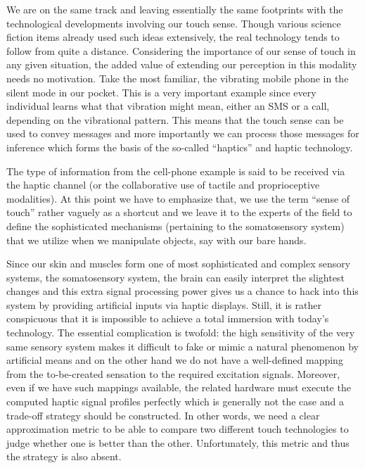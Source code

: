 We are on the same track and leaving essentially the same footprints with the technological developments involving our touch sense. Though various science fiction items already used such ideas extensively, the real technology tends to follow from quite a distance.  Considering the importance of our sense of touch in any given situation, the added value of extending our perception in this modality needs no motivation. Take the most familiar, the vibrating mobile phone in the silent mode in our pocket. This is a very important example since every individual learns what that vibration might mean, either an SMS or a call, depending on the vibrational pattern. This means that the touch sense can be used to convey messages and more importantly we can process those messages for inference which forms the basis of the so-called \enquote{haptics} and haptic technology.


The type of information from the cell-phone example is said to be received via the haptic channel (or the collaborative use of tactile and proprioceptive modalities). At this point we have to emphasize that, we use the term \enquote{sense of touch} rather vaguely as a shortcut and we leave it to the experts of the field to define the sophisticated mechanisms (pertaining to the somatosensory system) that we utilize when we manipulate objects, say with our bare hands. 


Since our skin and muscles form one of most sophisticated and complex sensory systems, the somatosensory system, the brain can easily interpret the slightest changes and this extra signal processing power gives us a chance to hack into this system by providing artificial inputs via haptic displays. Still, it is rather conspicuous that it is impossible to achieve a total immersion with today's technology. The essential complication is twofold: the high sensitivity of the very same sensory system makes it difficult to fake or mimic a natural phenomenon by artificial means and on the other hand we do not have a well-defined mapping from the to-be-created sensation to the required excitation signals. Moreover, even if we have such mappings available, the related hardware must execute the computed haptic signal profiles perfectly which is generally not the case and a trade-off strategy should be constructed. In other words, we need a clear approximation metric to be able to compare two different touch technologies to judge whether one is better than the other. Unfortunately, this metric and thus the strategy is also absent. 
 
